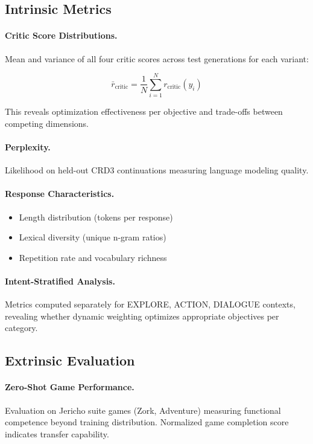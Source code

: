 \documentclass[11pt]{article}
\begin{document}
\subsection{Intrinsic Metrics}

\paragraph{Critic Score Distributions.} Mean and variance of all four critic scores across test generations for each variant:

\begin{equation}
\bar{r}_{\text{critic}} = \frac{1}{N} \sum_{i=1}^{N} r_{\text{critic}}(y_i)
\end{equation}

This reveals optimization effectiveness per objective and trade-offs between competing dimensions.

\paragraph{Perplexity.} Likelihood on held-out CRD3 continuations measuring language modeling quality.

\paragraph{Response Characteristics.}
\begin{itemize}
    \item Length distribution (tokens per response)
    \item Lexical diversity (unique n-gram ratios)
    \item Repetition rate and vocabulary richness
\end{itemize}

\paragraph{Intent-Stratified Analysis.} Metrics computed separately for EXPLORE, ACTION, DIALOGUE contexts, revealing whether dynamic weighting optimizes appropriate objectives per category.

\subsection{Extrinsic Evaluation}

\paragraph{Zero-Shot Game Performance.} Evaluation on Jericho suite games \cite{hausknecht2020interactive} (Zork, Adventure) measuring functional competence beyond training distribution. Normalized game completion score indicates transfer capability.
\end{document}
